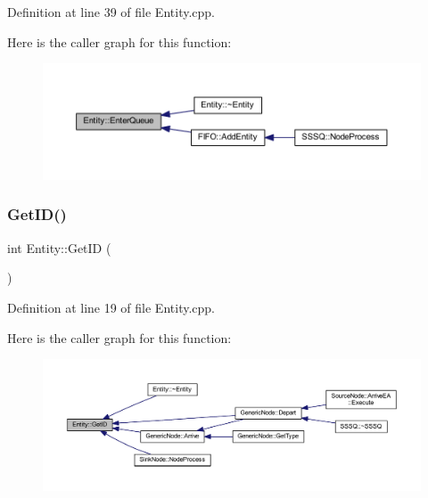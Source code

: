 Definition at line 39 of file Entity.\+cpp.

Here is the caller graph for this function\+:\nopagebreak
\begin{figure}[H]
\begin{center}
\leavevmode
\includegraphics[width=350pt]{class_entity_a957592ba81c76d59f622a887fee36e8d_icgraph}
\end{center}
\end{figure}
\mbox{\label{class_entity_a8ed56bc59a6c2b0bd01eda3d274a1fac}} 
\subsubsection{\texorpdfstring{Get\+I\+D()}{GetID()}}
{\footnotesize\ttfamily int Entity\+::\+Get\+ID (\begin{DoxyParamCaption}{ }\end{DoxyParamCaption})}



Definition at line 19 of file Entity.\+cpp.

Here is the caller graph for this function\+:
\nopagebreak
\begin{figure}[H]
\begin{center}
\leavevmode
\includegraphics[width=350pt]{class_entity_a8ed56bc59a6c2b0bd01eda3d274a1fac_icgraph}
\end{center}
\end{figure}
\mbox{\label{class_entity_a22d4fe26b229f7720f5204eeadffb1b2}} 
